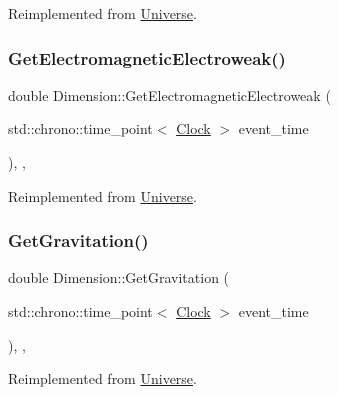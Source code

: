 Reimplemented from \mbox{\hyperlink{classUniverse_a63b850ef3f3394313353109d222bf5d1}{Universe}}.

\mbox{\label{classDimension_ae1babb1fa280c35966d7ee3de6655e4d}} 
\subsubsection{\texorpdfstring{Get\+Electromagnetic\+Electroweak()}{GetElectromagneticElectroweak()}}
{\footnotesize\ttfamily double Dimension\+::\+Get\+Electromagnetic\+Electroweak (\begin{DoxyParamCaption}\item[{std\+::chrono\+::time\+\_\+point$<$ \mbox{\hyperlink{universe_8h_a0ef8d951d1ca5ab3cfaf7ab4c7a6fd80}{Clock}} $>$}]{event\+\_\+time }\end{DoxyParamCaption})\hspace{0.3cm}{\ttfamily [inline]}, {\ttfamily [final]}, {\ttfamily [virtual]}}



Reimplemented from \mbox{\hyperlink{classUniverse_a9f099605c082e7fa755787a6a8cab7ba}{Universe}}.

\mbox{\label{classDimension_a652220a2eb1b26c749ad032865d81788}} 
\subsubsection{\texorpdfstring{Get\+Gravitation()}{GetGravitation()}}
{\footnotesize\ttfamily double Dimension\+::\+Get\+Gravitation (\begin{DoxyParamCaption}\item[{std\+::chrono\+::time\+\_\+point$<$ \mbox{\hyperlink{universe_8h_a0ef8d951d1ca5ab3cfaf7ab4c7a6fd80}{Clock}} $>$}]{event\+\_\+time }\end{DoxyParamCaption})\hspace{0.3cm}{\ttfamily [inline]}, {\ttfamily [final]}, {\ttfamily [virtual]}}



Reimplemented from \mbox{\hyperlink{classUniverse_ab0404e774ee0ed66b597ff5b8e989446}{Universe}}.


